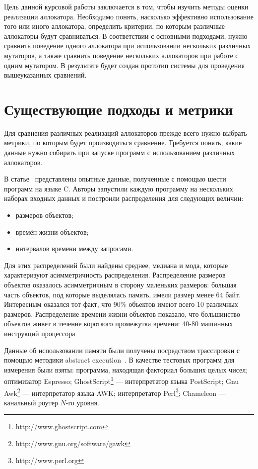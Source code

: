 Цель данной курсовой работы заключается в том, чтобы изучить методы оценки реализации аллокатора. Необходимо понять, насколько 
эффективно использование того или иного аллокатора, определить критерии, по которым различные аллокаторы будут сравниваться. В 
соответствии с основными подходами, нужно сравнить поведение одного аллокатора при использовании нескольких различных мутаторов, а также
сравнить поведение нескольких аллокаторов при работе с одним мутатором. В результате будет создан прототип системы для проведения 
вышеуказанных сравнений.
   
   
\section{Существующие подходы и метрики}

Для сравнения различных реализаций аллокаторов прежде всего нужно выбрать метрики, по которым будет 
производиться сравнение. Требуется понять, какие данные нужно собирать при запуске программ
с использованием различных аллокаторов.
   
В статье~\cite{six_progs} представлены опытные данные, полученные с помощью шести программ на языке
C. Авторы запустили каждую программу на нескольких наборах входных данных и построили распределения для следующих величин:
   
\begin{itemize}
\item размеров объектов;
\item времён жизни объектов;
\item интервалов времени между запросами.
\end{itemize}
   
Для этих распределений были найдены среднее, медиана и мода, которые характеризуют асимметричность распределения. Распределение размеров 
объектов оказалось асимметричным в сторону маленьких размеров: большая часть объектов, под которые выделялась память, 
имели размер менее 64 байт. Интересным оказался тот факт, что 90\% объектов имеют всего 10 различных размеров. Распределение времени жизни
объектов показало, что большинство объектов живет в течение короткого промежутка времени: 40-80 машинных инструкций процессора 
   
Данные об использовании памяти были получены посредством трассировки с помощью методики abstract execution~\cite{ae}. В качестве 
тестовых программ для измерения были взяты: программа, находящая факториал больших целых чисел; оптимизатор Espresso; 
GhostScript\footnote{http://www.ghostscript.com} --- интерпретатор языка PostScript; Gnu Awk\footnote{http://www.gnu.org/software/gawk} --- 
интерпретатор языка AWK; интерпретатор Perl\footnote{http://www.perl.org}; Chameleon --- канальный роутер $N$-го уровня.
   
